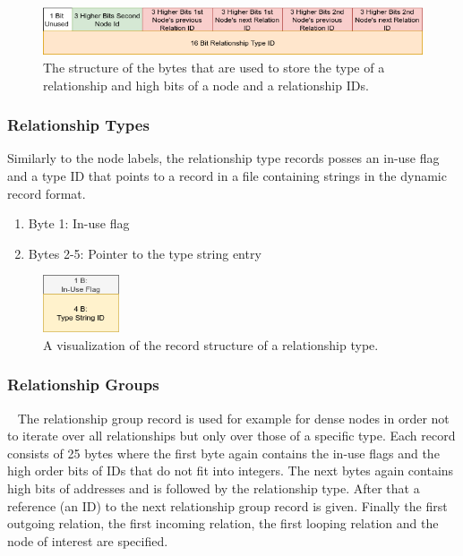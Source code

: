 \documentclass[a4paper,10pt]{article}
\begin{document}
\begin{figure}[htp]\label{rel_type_bytes}
 \begin{center}
  \includegraphics[keepaspectratio,width=\textwidth]{img/relationship/relationship_type_bytes.png}
 \end{center}
 \caption{The structure of the bytes that are used to store the type of a relationship and high bits of a node and a relationship IDs.} %
\end{figure}
    

    \subsubsection{Relationship Types}
    Similarly to the node labels, the relationship type records posses an in-use flag and a type ID that points to a record in a file containing strings in the dynamic record format.
        \begin{enumerate}
     \item Byte 1: In-use flag
     \item Bytes 2-5: Pointer to the type string entry
    \end{enumerate}
    
    \begin{figure}[H]\label{rel_type_record}
        \begin{center}
            \includegraphics[keepaspectratio,height=0.2\textheight,width=0.2\textwidth]{img/relationship/rel_type_record.png}
        \end{center}
        \caption{A visualization of the record structure of a relationship type.} %
    \end{figure}
    
    \subsubsection{Relationship Groups}~\label{rel_group}
    The relationship group record is used for example for dense nodes in order not to iterate over all relationships but only over those of a specific type. Each record consists of 25 bytes where the first byte again contains the in-use flags and the high order bits of IDs that do not fit into integers. The next bytes again contains high bits of addresses and is followed by the relationship type. After that a reference (an ID) to the next relationship group record is given. Finally the first outgoing relation, the first incoming relation, the first looping relation and the node of interest are specified.
    
\end{document}
